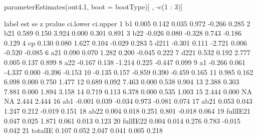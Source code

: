 \begin{Schunk}
\begin{Sinput}
 parameterEstimates(out4.1, boot = bootType)[ , -c(1 : 3)]
\end{Sinput}
\begin{Soutput}
      label    est    se      z pvalue ci.lower ci.upper
1        b1  0.005 0.142  0.035  0.972   -0.266    0.285
2       b21  0.589 0.150  3.924  0.000    0.301    0.891
3       b22 -0.026 0.080 -0.328  0.743   -0.186    0.129
4        cp  0.130 0.080  1.627  0.104   -0.029    0.283
5      d211 -0.301 0.111 -2.721  0.006   -0.520   -0.085
6       a21  0.090 0.070  1.282  0.200   -0.045    0.222
7      d221  0.532 0.192  2.777  0.005    0.137    0.899
8       a22 -0.167 0.138 -1.214  0.225   -0.447    0.099
9        a1 -0.266 0.061 -4.337  0.000   -0.396   -0.153
10          -0.135 0.157 -0.859  0.390   -0.459    0.165
11           0.985 0.162  6.098  0.000    0.750    1.477
12           0.689 0.092  7.463  0.000    0.538    0.904
13           2.388 0.303  7.881  0.000    1.894    3.158
14           0.719 0.113  6.378  0.000    0.535    1.003
15           2.444 0.000     NA     NA    2.444    2.444
16      ab1 -0.001 0.039 -0.034  0.973   -0.081    0.074
17     ab21  0.053 0.043  1.247  0.212   -0.019    0.151
18     ab22  0.004 0.018  0.251  0.801   -0.018    0.064
19 fullIE21  0.047 0.025  1.871  0.061    0.013    0.123
20 fullIE22  0.004 0.014  0.276  0.783   -0.015    0.042
21  totalIE  0.107 0.052  2.047  0.041    0.005    0.218
\end{Soutput}
\end{Schunk}
